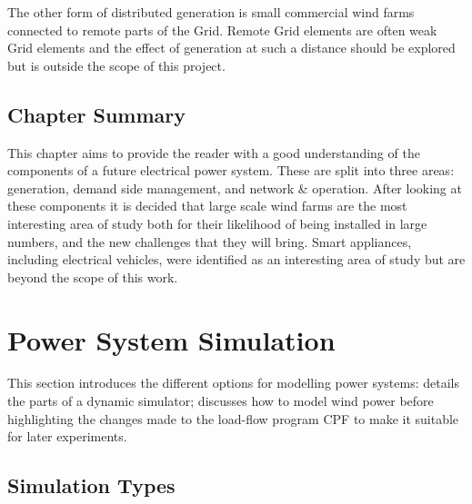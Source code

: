 \documentclass[a4paper,oneside,12pt]{report}
\begin{document}
The other form of distributed generation is small commercial wind farms connected to remote parts of the Grid. Remote Grid elements are often weak Grid elements and the effect of generation at such a distance should be explored but is outside the scope of this project.


\section{Chapter Summary}

This chapter aims to provide the reader with a good understanding of the components of a future electrical power system. These are split into three areas: generation, demand side management, and network \& operation. After looking at these components it is decided that large scale wind farms are the most interesting area of study both for their likelihood of being installed in large numbers, and the new challenges that they will bring. Smart appliances, including electrical vehicles, were identified as an interesting area of study but are beyond the scope of this work.

















\chapter{Power System Simulation} \label{chap_simulation}

This section introduces the different options for modelling power systems: details the parts of a dynamic simulator; discusses how to model wind power before highlighting the changes made to the load-flow program CPF to make it suitable for later experiments.

\section{Simulation Types}
\end{document}
